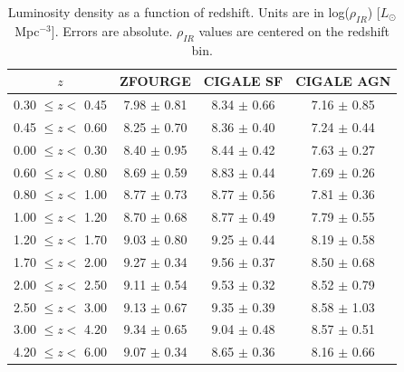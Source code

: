 \begin{table}
    \begin{center}
    \caption{Luminosity density as a function of redshift. Units are in log($\rho_{IR}$) [$L_{\odot}$ Mpc$^{-3}$]. Errors are absolute. $\rho_{IR}$ values are centered on the redshift bin.}
    \label{Tab: SFRD}
    \begin{tabular}{@{}cccc@{}}
        \toprule
        $z$ & ZFOURGE & CIGALE SF & CIGALE AGN \\
        \hline
        0.30 $\leq z <$ 0.45 & 7.98 $\pm$ 0.81 & 8.34 $\pm$ 0.66 & 7.16 $\pm$ 0.85 \\
        0.45 $\leq z <$ 0.60 & 8.25 $\pm$ 0.70 & 8.36 $\pm$ 0.40 & 7.24 $\pm$ 0.44 \\
        0.00 $\leq z <$ 0.30 & 8.40 $\pm$ 0.95 & 8.44 $\pm$ 0.42 & 7.63 $\pm$ 0.27 \\
        0.60 $\leq z <$ 0.80 & 8.69 $\pm$ 0.59 & 8.83 $\pm$ 0.44 & 7.69 $\pm$ 0.26 \\
        0.80 $\leq z <$ 1.00 & 8.77 $\pm$ 0.73 & 8.77 $\pm$ 0.56 & 7.81 $\pm$ 0.36 \\
        1.00 $\leq z <$ 1.20 & 8.70 $\pm$ 0.68 & 8.77 $\pm$ 0.49 & 7.79 $\pm$ 0.55 \\
        1.20 $\leq z <$ 1.70 & 9.03 $\pm$ 0.80 & 9.25 $\pm$ 0.44 & 8.19 $\pm$ 0.58 \\
        1.70 $\leq z <$ 2.00 & 9.27 $\pm$ 0.34 & 9.56 $\pm$ 0.37 & 8.50 $\pm$ 0.68 \\
        2.00 $\leq z <$ 2.50 & 9.11 $\pm$ 0.54 & 9.53 $\pm$ 0.32 & 8.52 $\pm$ 0.79 \\
        2.50 $\leq z <$ 3.00 & 9.13 $\pm$ 0.67 & 9.35 $\pm$ 0.39 & 8.58 $\pm$ 1.03 \\
        3.00 $\leq z <$ 4.20 & 9.34 $\pm$ 0.65 & 9.04 $\pm$ 0.48 & 8.57 $\pm$ 0.51 \\
        4.20 $\leq z <$ 6.00 & 9.07 $\pm$ 0.34 & 8.65 $\pm$ 0.36 & 8.16 $\pm$ 0.66 \\
        \bottomrule
    \end{tabular}
    \end{center}        
\end{table}

